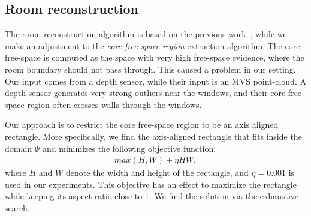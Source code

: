 \subsection{Room reconstruction}
The room reconstruction algorithm is based on the previous
work~\cite{floorplan_14}, while we make an adjustment to the {\em core
free-space region} extraction algorithm. The core free-space is computed
as the space with very high free-space evidence, where the room boundary
should not pass through. This caused a problem in our setting. Our
input comes from a depth sensor, while their input is an MVS
point-cloud. A depth sensor generates very strong outliers near the
windows, and their core free-space region often crosses walls through the
windows.

Our approach is to restrict the core free-space region to be an axis
aligned rectangle. More specifically, we find the axis-aligned rectangle
that fits inside the domain $\Psi$ and minimizes the following objective
function:
\begin{eqnarray*}
 max(H, W) + \eta H W,
\end{eqnarray*}
where $H$ and $W$ denote the width and height of the rectangle, and
$\eta=0.001$ is used in our experiments.  This objective has an effect
to maximize the rectangle while keeping its aspect ratio close to 1. We
find the solution via the exhaustive search.






